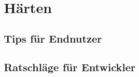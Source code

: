 \documentclass{beamer}
\begin{document}
\section{Härten}
	\subsection{Tips für Endnutzer}
	\subsection{Ratschläge für Entwickler}
	






\end{document}
